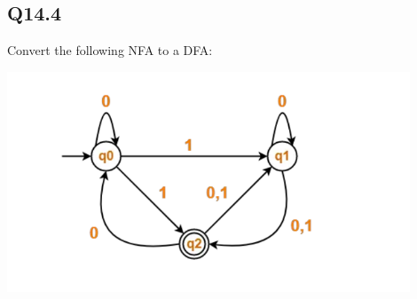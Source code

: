 \documentclass{article}
\begin{document}
\subsection*{Q14.4}
Convert the following NFA to a DFA:
\begin{center}
    \includegraphics[width=12cm]{13.png}
\end{center}
\newpage
\end{document}
